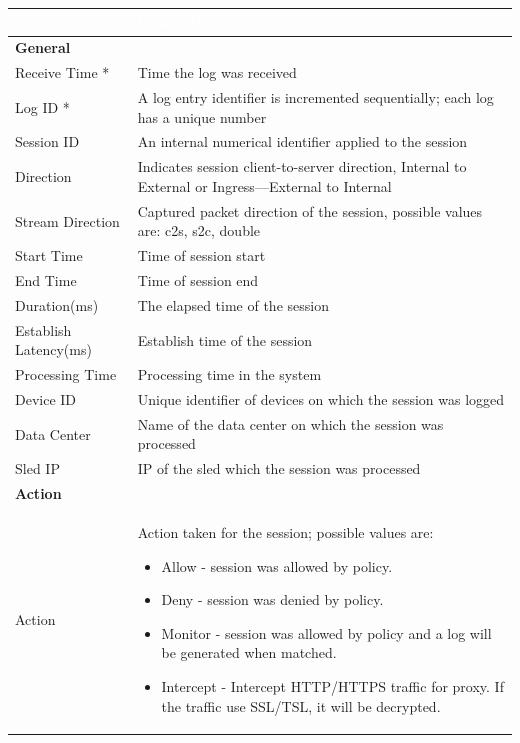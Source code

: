 \begin{longtable}{p{}|p{}}   
    \rowcolor{black}\multicolumn{1}{l!\vlinewhite}{\textcolor{white}{Field}}  & \textcolor{white}{Description} \\\hline  
    \multicolumn{2}{l}{\textbf{General}} \\\hline 
    Receive Time * &	Time the log was received \\\hline
    Log ID * &	A log entry identifier is incremented sequentially; each log has a unique number \\\hline
    Session ID &	An internal numerical identifier applied to the session \\\hline
    Direction &	Indicates session client-to-server direction, 
                Internal to External or Ingress—External to Internal \\\hline
    Stream Direction &	Captured packet direction of the session, possible values are: c2s, s2c, double  \\\hline
    Start Time &	Time of session start  \\\hline
    End Time &	Time of session end \\\hline
    Duration(ms) &	The elapsed time of the session  \\\hline
    Establish Latency(ms) &	Establish time of the session  \\\hline
    Processing Time	& Processing time in the system  \\\hline
    Device ID &	Unique identifier of devices on which the session was logged  \\\hline
    Data Center &	Name of the data center on which the session was processed \\\hline
    Sled IP &	IP of the sled which the session was processed  \\\hline
    \multicolumn{2}{l}{\textbf{Action}}  \\\hline
    Action &	Action taken for the session; possible values are:
                \begin{itemize}
                    \item Allow - session was allowed by policy. 
                    \item Deny - session was denied by policy.  
                    \item Monitor - session was allowed by policy and a log will be generated when matched.
                    \item Intercept - Intercept HTTP/HTTPS traffic for proxy. If the traffic use SSL/TSL, it will be decrypted.  

\end{itemize}
\end{longtable}
